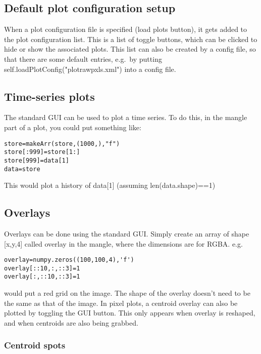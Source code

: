 \documentclass[a4,10pt]{article}
\newcommand{\ignore}[1]{}
\begin{document}
\subsection{Default plot configuration setup}
When a plot configuration file is specified (load plots button), it
gets added to the plot configuration list.  This is a list of toggle
buttons, which can be clicked to hide or show the associated plots.
This list can also be created by a config file, so that there are some
default entries, e.g.\ by putting
self.loadPlotConfig("plotrawpxls.xml") into a config file.

\subsection{Time-series plots}
The standard GUI can be used to plot a time series.
To do this, in the mangle part of a plot, you could put something
like:
\begin{verbatim}
store=makeArr(store,(1000,),"f")
store[:999]=store[1:]
store[999]=data[1]
data=store
\end{verbatim}
This would plot a history of data[1] (assuming len(data.shape)==1)

\subsection{Overlays}
Overlays can be done using the standard GUI.
Simply create an array of shape [x,y,4] called overlay in the mangle,
where the dimensions are for RGBA.  
e.g.
\begin{verbatim}
overlay=numpy.zeros((100,100,4),'f')
overlay[::10,:,::3]=1
overlay[:,::10,::3]=1
\end{verbatim}
would put a red grid on the image.  The shape of the overlay doesn't
need to be the same as that of the image.
In pixel plots, a centroid overlay can also be plotted by toggling the
GUI button.  This only appears when overlay is reshaped, and when
centroids are also being grabbed.

\subsubsection{Centroid spots}
\ignore{
Plotting overlay of centroid spots on pixel images:  e.g. for a single
camera, 128x128 pixels, use:
data.shape=128,128;overlay.shape=128,128,4
Can use spot module to change the shape of the spots...
e.g.
\begin{verbatim}
data.shape=128,128
overlay.shape=128,128,4;import spot;overlay=spot.expandPoints(overlay)
spot.expandPoints can take ``cross'' or ``circ'' as 2nd argument
(typ), and an odd number as 3rd argument, diam.  Alternatively, a spot
shape can be passed to sh, e.g.
spot.expandPoints(overlay,sh=numpy.ones((3,3,4))) to create a white square.

Or, you can set self.centOverlayPattern to be whatever you want,
currently using the command panel, though this will probably become a
config option.  Shape is x,y,4.  e.g.
self.centOverlayPattern=numpy.zeros((8,8,4),"f")
self.centOverlayPattern[:,:]=1
self.centOverlayPattern[2:6,2:6,2]=0
self.centOverlayPattern[0::7,0::7]=0
\end{verbatim}
to get fried eggs.
}
\end{document}
